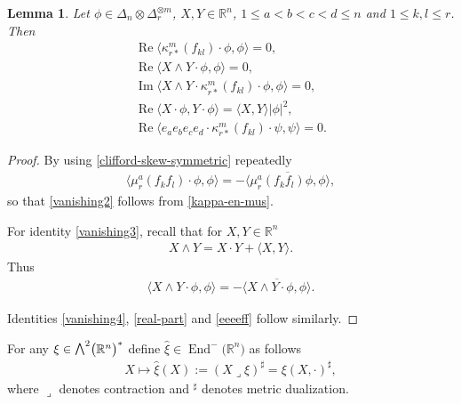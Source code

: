 \documentclass[10pt,a4paper]{amsart}
\newcommand{\ext}{\raise1pt\hbox{\small$\bigwedge$}}
\numberwithin{equation}{section}
\newtheorem{Lemma}[Theorem]{Lemma}
\begin{document}
\begin{Lemma}\label{lemma:vanishings} Let $\phi\in\Delta_n\otimes\Delta_r^{\otimes m}$, $X,Y\in\mathbb{R}^n$, $1\leq a<b<c<d\leq n$ and $1\leq k,l\leq r$. Then
\begin{gather}
\operatorname{Re}\big\langle \kappa_{r*}^m(f_{kl})\cdot \phi,\phi\big\rangle =0,\label{vanishing2}\\
\operatorname{Re}\langle X\wedge Y\cdot\phi,\phi\rangle =0,\label{vanishing3}\\
\operatorname{Im}\langle X\wedge Y\cdot \kappa_{r*}^m(f_{kl})\cdot\phi,\phi\rangle = 0,\label{vanishing4}\\
\operatorname{Re} \langle X\cdot \phi,Y\cdot\phi \rangle = \langle X,Y\rangle |\phi|^2, \label{real-part}\\
\operatorname{Re} \big\langle e_ae_be_ce_d\cdot \kappa_{r*}^m(f_{kl})\cdot\psi,\psi \big\rangle =0.\label{eeeeff}
\end{gather}
\end{Lemma}
\begin{proof}
By using \eqref{clifford-skew-symmetric} repeatedly
\begin{gather*}
 \langle \mu_{r}^a(f_kf_l)\cdot\phi,\phi\rangle = -\overline{\langle \mu_{r}^a(f_kf_l)\phi,\phi\rangle },
\end{gather*}
so that \eqref{vanishing2} follows from \eqref{kappa-en-mus}.

For identity \eqref{vanishing3}, recall that for $X, Y\in \mathbb{R}^n$
\begin{gather*} X\wedge Y = X\cdot Y + \langle X,Y\rangle .\end{gather*}
Thus
\begin{gather*}
 \langle X\wedge Y\cdot \phi,\phi\rangle = -\overline{\langle X\wedge Y \cdot\phi,\phi\rangle }.
\end{gather*}

Identities \eqref{vanishing4}, \eqref{real-part} and \eqref{eeeeff} follow similarly.
\end{proof}

For any $\xi\in\ext^2\big(\mathbb{R}^n\big)^*$ define $\hat\xi\in\operatorname{End}^-\big(\mathbb{R}^n\big)$ as follows
\begin{gather*}
 X \mapsto \hat\xi(X) := (X\lrcorner \xi)^\sharp =\xi(X,\cdot)^\sharp,
\end{gather*}
where $\lrcorner$ denotes contraction and $^\sharp$ denotes metric dualization.
\end{document}
